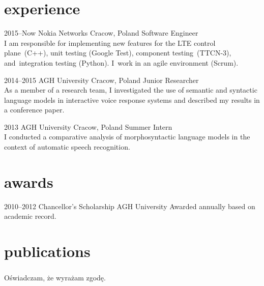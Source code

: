 \documentclass[]{friggeri-cv} %
\begin{document}

\section{experience}
\begin{entrylist}

\entry
{2015--Now}
{Nokia Networks}
{Cracow, Poland}
{Software Engineer \\
  I am responsible for implementing new features for the LTE control plane~(C++), unit testing (Google Test), component testing~(TTCN-3), and~integration testing (Python). I~work in an agile environment (Scrum).\\}

\entry
{2014--2015}
{AGH University}
{Cracow, Poland}
{Junior Researcher \\
  As a member of a research team, I investigated the use of semantic and syntactic language models in interactive voice response systems and described my results in a conference paper.\\}

\entry
{2013}
{AGH University}
{Cracow, Poland}
{Summer Intern \\
  I conducted a comparative analysis of morphosyntactic language models in the context of automatic speech recognition.}

\end{entrylist}


\section{awards}

\begin{entrylist}

\entry
{2010--2012}
{Chancellor's Scholarship}
{AGH University}
{Awarded annually based on academic record.}
\end{entrylist}


\section{publications}

\subsubsection{}Oświadczam, że wyrażam zgodę.
\end{document}
